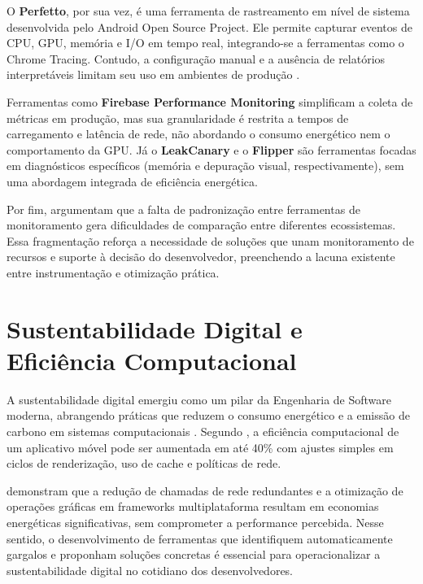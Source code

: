 \documentclass[12pt,a4paper,oneside]{abntex2}
\begin{document}
O \textbf{Perfetto}, por sua vez, é uma ferramenta de rastreamento em nível de sistema desenvolvida pelo Android Open Source Project. Ele permite capturar eventos de CPU, GPU, memória e I/O em tempo real, integrando-se a ferramentas como o Chrome Tracing. Contudo, a configuração manual e a ausência de relatórios interpretáveis limitam seu uso em ambientes de produção \cite{aosp2024}.

Ferramentas como \textbf{Firebase Performance Monitoring} simplificam a coleta de métricas em produção, mas sua granularidade é restrita a tempos de carregamento e latência de rede, não abordando o consumo energético nem o comportamento da GPU. Já o \textbf{LeakCanary} e o \textbf{Flipper} são ferramentas focadas em diagnósticos específicos (memória e depuração visual, respectivamente), sem uma abordagem integrada de eficiência energética.

Por fim, \textcite{kumar2019optimization} \cite{kumar2019optimization} argumentam que a falta de padronização entre ferramentas de monitoramento gera dificuldades de comparação entre diferentes ecossistemas. Essa fragmentação reforça a necessidade de soluções que unam monitoramento de recursos e suporte à decisão do desenvolvedor, preenchendo a lacuna existente entre instrumentação e otimização prática.
 
\section{Sustentabilidade Digital e Eficiência Computacional}
A sustentabilidade digital emergiu como um pilar da Engenharia de Software moderna, abrangendo práticas que reduzem o consumo energético e a emissão de carbono em sistemas computacionais \cite{ieee2023sustainability, unep2023}. Segundo \textcite{google2024sustainability} \cite{google2024sustainability}, a eficiência computacional de um aplicativo móvel pode ser aumentada em até 40\% com ajustes simples em ciclos de renderização, uso de cache e políticas de rede.  

\textcite{cheng2020energy} \cite{cheng2020energy} demonstram que a redução de chamadas de rede redundantes e a otimização de operações gráficas em frameworks multiplataforma resultam em economias energéticas significativas, sem comprometer a performance percebida. Nesse sentido, o desenvolvimento de ferramentas que identifiquem automaticamente gargalos e proponham soluções concretas é essencial para operacionalizar a sustentabilidade digital no cotidiano dos desenvolvedores.
\end{document}
